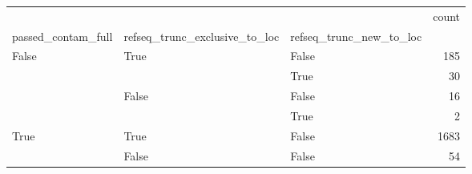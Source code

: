 \begin{tabular}{lllr}
\toprule
 &  &  & count \\
passed_contam_full & refseq_trunc_exclusive_to_loc & refseq_trunc_new_to_loc &  \\
\midrule
\multirow[t]{4}{*}{False} & \multirow[t]{2}{*}{True} & False & 185 \\
 &  & True & 30 \\
\cline{2-4}
 & \multirow[t]{2}{*}{False} & False & 16 \\
 &  & True & 2 \\
\cline{1-4} \cline{2-4}
\multirow[t]{2}{*}{True} & True & False & 1683 \\
\cline{2-4}
 & False & False & 54 \\
\cline{1-4} \cline{2-4}
\bottomrule
\end{tabular}
